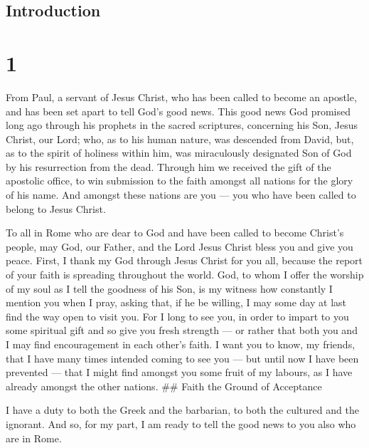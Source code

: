 \hypertarget{introduction}{%
\subsection{Introduction}\label{introduction}}

\hypertarget{section}{%
\section{1}\label{section}}

 From Paul, a servant of Jesus Christ, who has been called
to become an apostle, and has been set apart to tell God's good news.
 This good news God promised long ago through his prophets
in the sacred scriptures,  concerning his Son, Jesus Christ,
our Lord; who, as to his human nature, was descended from David,
 but, as to the spirit of holiness within him, was
miraculously designated Son of God by his resurrection from the dead.
 Through him we received the gift of the apostolic office,
to win submission to the faith amongst all nations for the glory of his
name.  And amongst these nations are you --- you who have
been called to belong to Jesus Christ.

 To all in Rome who are dear to God and have been called to
become Christ's people, may God, our Father, and the Lord Jesus Christ
bless you and give you peace.  First, I thank my God through
Jesus Christ for you all, because the report of your faith is spreading
throughout the world.  God, to whom I offer the worship of
my soul as I tell the goodness of his Son, is my witness how constantly
I mention you when I pray,  asking that, if he be willing,
I may some day at last find the way open to visit you.  For
I long to see you, in order to impart to you some spiritual gift and so
give you fresh strength ---  or rather that both you and I
may find encouragement in each other's faith.  I want you
to know, my friends, that I have many times intended coming to see you
--- but until now I have been prevented --- that I might find amongst
you some fruit of my labours, as I have already amongst the other
nations. \#\# Faith the Ground of Acceptance

 I have a duty to both the Greek and the barbarian, to both
the cultured and the ignorant.  And so, for my part, I am
ready to tell the good news to you also who are in Rome.

